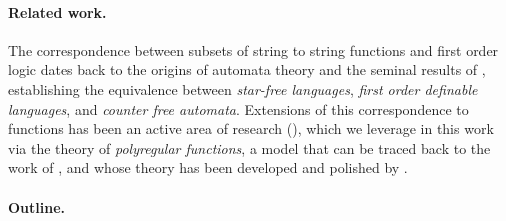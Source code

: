 \paragraph{Related work.} The correspondence between subsets of string to
string functions and first order logic dates back to the origins of automata
theory and the seminal results of \cite{PEPI86,SCHU65,MNPA71}, establishing the
equivalence between \emph{star-free languages}, \emph{first order definable
languages}, and \emph{counter free automata}. Extensions of this correspondence
to functions has been an active area of research (\cite{CADA15,MUSC19}), which
we leverage in this work via the theory of \emph{polyregular functions}, a
model that can be traced back to the work of \cite{ENMA02}, and whose theory
has been developed and polished by \cite{bojanczyk2018polyregular}.


\paragraph{Outline.}

